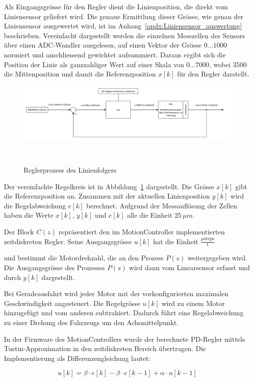 \documentclass[main.tex]{subfiles} %
\begin{document}
Als Eingangsgrösse für den Regler dient die Linienposition, die direkt vom
Liniensensor geliefert wird. Die genaue Ermittlung dieser Grösse, wie genau der
Liniensensor ausgewertet wird, ist im Anhang~\ref{apdx:Liniensensor_auswertung}
beschrieben. Vereinfacht dargestellt werden die einzelnen Messzellen des
Sensors über einen ADC-Wandler ausgelesen, auf einen Vektor der Grösse $0 \dots
    1000$ normiert und anschliessend gewichtet aufsummiert. Daraus ergibt sich die
Position der Linie als ganzzahliger Wert auf einer Skala von $0 \dots 7000$,
wobei $3500$ die Mittenposition und damit die Referenzposition $x[k]$ für den
Regler darstellt.

\begin{figure}[H]
    \centering
    \includegraphics[width=1.0\linewidth]{../../Anhang_subfiles/Anhang_Elektronik/fig_Parametrierung_Linienfolgeregler/RegelProzess_Linienfolger.pdf}
    \caption{Reglerprozess des Linienfolgers}~\label{fig:Linienfolger_RegelProzess_ht}
\end{figure}

Der vereinfachte Regelkreis ist in
Abbildung~\ref{fig:Linienfolger_RegelProzess_ht} dargestellt. Die Grösse $x[k]$
gibt die Referenzposition an. Zusammen mit der aktuellen Linienposition $y[k]$
wird die Regelabweichung $e[k]$ berechnet. Aufgrund der Messauflösung der
Zellen haben die Werte $x[k]$, $y[k]$ und $e[k]$ alle die Einheit $25 \,\mu m$. 

Der Block $C(z)$ repräsentiert den im MotionController implementierten
zeitdiskreten Regler. Seine Ausgangsgrösse $u[k]$ hat die Einheit $\frac{\mu
        \text{steps}}{t}$

und bestimmt die Motordrehzahl, die an den Prozess $P(s)$ weitergegeben wird.
Die Ausgangsgrösse des Prozesses $P(s)$ wird dann vom Linearsensor erfasst und
durch $y[k]$ dargestellt.

Bei Geradeausfahrt wird jeder Motor mit der vorkonfigurierten maximalen
Geschwindigkeit angesteuert. Die Regelgrösse $u[k]$ wird zu einem Motor
hinzugefügt und vom anderen subtrahiert. Dadurch führt eine Regelabweichung zu
einer Drehung des Fahrzeugs um den Achsmittelpunkt.

In der Firmware des MotionControllers wurde der berechnete PD-Regler mittels
Tustin-Approximation in den zeitdiskreten Bereich übertragen. Die
Implementierung als Differenzengleichung lautet:

\[
    u[k] = \beta \cdot e[k] - \beta \cdot e[k - 1] + \alpha \cdot u[k - 1]
\]
\end{document}
